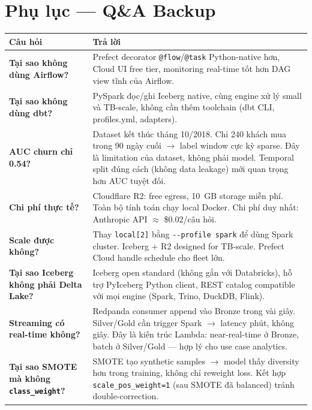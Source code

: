 \documentclass[12pt, a4paper]{article}
\begin{document}
\newpage

\section{Phụ lục — Q\&A Backup}

\begin{tcolorbox}[colback=blue!5, colframe=blue!40, arc=6pt,
  title={\faQuestion\ Câu hỏi thường gặp — Trả lời ngắn}]

\renewcommand{\arraystretch}{1.6}
\begin{tabularx}{\textwidth}{>{\bfseries}p{5.5cm} X}
\toprule
Câu hỏi & Trả lời \\
\midrule
Tại sao không dùng Airflow? &
Prefect decorator \texttt{@flow}/\texttt{@task} Python-native hơn, Cloud UI free tier,
monitoring real-time tốt hơn DAG view tĩnh của Airflow. \\

Tại sao không dùng dbt? &
PySpark đọc/ghi Iceberg native, cùng engine xử lý small và TB-scale,
không cần thêm toolchain (dbt CLI, profiles.yml, adapters). \\

AUC churn chỉ 0.54? &
Dataset kết thúc tháng 10/2018. Chỉ 240 khách mua trong 90 ngày cuối
$\to$ label window cực kỳ sparse. Đây là limitation của dataset, không phải model.
Temporal split đúng cách (không data leakage) mới quan trọng hơn AUC tuyệt đối. \\

Chi phí thực tế? &
Cloudflare R2: free egress, 10~GB storage miễn phí. Toàn bộ tính toán
chạy local Docker. Chi phí duy nhất: Anthropic API $\approx$ \$0.02/câu hỏi. \\

Scale được không? &
Thay \texttt{local[2]} bằng \texttt{-{}-profile spark} để dùng Spark cluster.
Iceberg + R2 designed for TB-scale. Prefect Cloud handle schedule cho fleet lớn. \\

Tại sao Iceberg không phải Delta Lake? &
Iceberg open standard (không gắn với Databricks), hỗ trợ PyIceberg Python client,
REST catalog compatible với mọi engine (Spark, Trino, DuckDB, Flink). \\

Streaming có real-time không? &
Redpanda consumer append vào Bronze trong vài giây. Silver/Gold cần trigger Spark
$\to$ latency phút, không giây. Đây là kiến trúc Lambda: near-real-time ở Bronze,
batch ở Silver/Gold — hợp lý cho use case analytics. \\

Tại sao SMOTE mà không \texttt{class\_weight}? &
SMOTE tạo synthetic samples $\to$ model thấy diversity hơn trong training,
không chỉ reweight loss. Kết hợp \texttt{scale\_pos\_weight=1} (sau SMOTE đã balanced)
tránh double-correction. \\
\bottomrule
\end{tabularx}
\end{tcolorbox}
\end{document}
